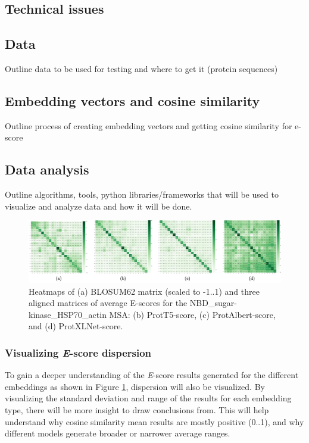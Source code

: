 \documentclass[
	letterpaper, %
	10pt, %
]{journalArticle}
\begin{document}
\subsection{Technical issues}

\subsection{Data}
Outline data to be used for testing and where to get it (protein sequences)

\subsection{Embedding vectors and cosine similarity}
Outline process of creating embedding vectors and getting cosine similarity for e-score

\subsection{Data analysis}
Outline algorithms, tools, python libraries/frameworks that will be used to visualize and analyze data and how it will be done.

\begin{figure} %
	\includegraphics[width=\linewidth]{Figures/Escorematrices.jpeg}
	\caption{Heatmaps of (a) BLOSUM62 matrix (scaled to -1..1) and three aligned matrices of average E-scores for the NBD\_sugar-kinase\_HSP70\_actin MSA: (b) ProtT5-score, (c) ProtAlbert-score, and (d) ProtXLNet-score.}
	\label{fig:escoreheatmap}
\end{figure}

\subsubsection{Visualizing \textit{E}-score dispersion}

To gain a deeper understanding of the \textit{E}-score results generated for the different embeddings as shown in Figure \ref{fig:escoreheatmap}, dispersion will also be visualized. By visualizing the standard deviation and range of the results for each embedding type, there will be more insight to draw conclusions from. This will help understand why cosine similarity mean results are mostly positive (0..1), and why different models generate broader or narrower average ranges.
\end{document}
